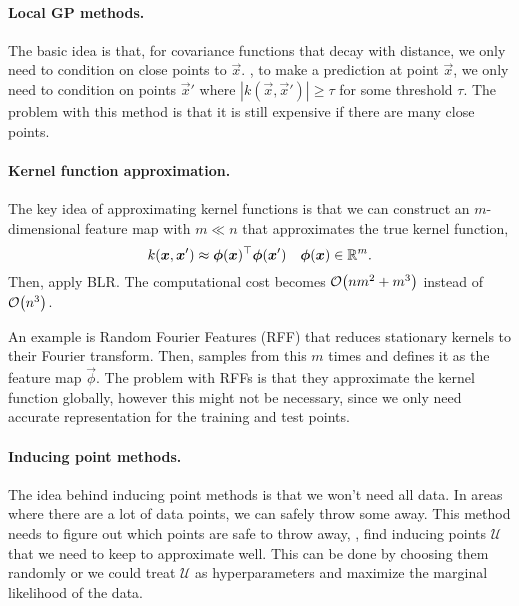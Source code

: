 \paragraph{Local GP methods.}

The basic idea is that, for covariance functions that decay with
distance, we only need to condition on close points to $\vec{x}$.
\Ie, to make a prediction at point $\vec{x}$, we only need to condition on
points $\vec{x}'$ where $|k(\vec{x},\vec{x}')|\geq \tau$ for some threshold
$\tau$. The problem with this method is that it is still expensive if there
are many close points.

\paragraph{Kernel function approximation.}

The key idea of approximating kernel functions is that we can construct an
$m$-dimensional feature map with $m \ll n$ that approximates the true kernel
function, \[
  k(\bm{x},\bm{x}')\approx \bm{\phi}(\bm{x})^\top \bm{\phi}(\bm{x}') \hspace{1em} \bm{\phi}(\bm{x})\in\mathbb{R}^m
.\]
Then, apply BLR. The computational cost becomes $\bigo{nm^2 + m^3}$ instead of
$\bigo{n^3}$.

An example is Random Fourier Features (RFF) that reduces stationary kernels to
their Fourier transform. Then, samples from this $m$ times and defines it as
the feature map $\vec{\phi}$. The problem with RFFs is that they approximate
the kernel function globally, however this might not be necessary, since we
only need accurate representation for the training and test points.

\paragraph{Inducing point methods.}

The idea behind inducing point methods is that we won't need all data. In areas
where there are a lot of data points, we can safely throw some away. This
method needs to figure out which points are safe to throw away, \ie, find
inducing points $\mathcal{U}$ that we need to keep to approximate well. This
can be done by choosing them randomly or we could treat $\mathcal{U}$ as
hyperparameters and maximize the marginal likelihood of the data.
